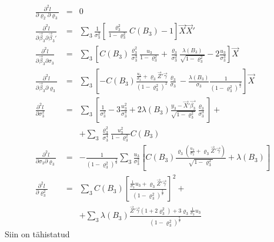 \documentclass[a4paper]{article}
\numberwithin{equation}{subsection}
\begin{document}
\begin{eqnarray}
\frac{ \partial^2 l}{\partial\varrho_2 \partial\varrho_3}
  &=& 0 \\
\frac{ \partial^2 l}{\partial\vec{\beta}_3 \partial\vec{\beta}_3'} &=&
  \sum_3 \frac{1}{\sigma_3^2} \left[
  \frac{\varrho_3^2}{1 - \varrho_3^2}C(B_3) - 1 \right]
  \vec{X}\vec{X}' \\
\frac{ \partial^2 l}{\partial\vec{\beta}_3 \partial\sigma_3} &=&
  \sum_3 \left[
    C(B_3) \frac{\varrho_3^2}{\sigma_3^3}
      \frac{u_3}{1 - \varrho_3^2}
    + \frac{\varrho_3}{\sigma_3^2}
      \frac{\lambda(B_3)}{\sqrt{1 - \varrho_3^2}}
    - 2\frac{u_3}{\sigma_3^3}
    \right] \vec{X} \\
\frac{ \partial^2 l}{\partial\vec{\beta}_3 \partial\varrho_3} &=&
  \sum_3 \left[
    -C(B_3) \frac
      {\displaystyle \frac{u_3}{\sigma_3} +
        \varrho_3\vec{Z}'\vec{\gamma}}
      {(1 - \varrho_3^2)^2}
      \frac{\varrho_3}{\sigma_3}
    - \frac{\lambda(B_3)}{\sigma_3}
      \frac{1}{(1 - \varrho_3^2)^\frac{3}{2}}
    \right] \vec{X}\\
\frac{ \partial^2 l}{\partial \sigma_3^2} &=&
  \sum_3 \left[
    \frac{1}{\sigma_3^2}
    - 3 \frac{ u_3^2}{\sigma_3^4}
    + 2 \lambda( B_3)
      \frac{y_3 - \vec{X}'\vec{\beta_3}}{\sqrt{1- \varrho_3^2}}
      \frac{\varrho_3}{\sigma_3^3}
    \right] + \nonumber\\
&&  + \sum_3
      \frac{\varrho_3^2}{\sigma_3^4}
      \frac{ u_3^2}{1 - \varrho_3^2}
      C(B_3) \\
\frac{ \partial^2 l}{\partial \sigma_3 \partial\varrho_3} &=&
  -\frac{1}{(1 - \varrho_3^2)^\frac{3}{2}}
  \sum_3  \frac{u_3}{\sigma_3^2} \left[
    C(B_3) \frac
      {\varrho_3 \left(
      \displaystyle \frac{u_3}{\sigma_3} +
        \varrho_3 \vec{Z}'\vec{\gamma} \right)}
      {\sqrt{1-\varrho_3^2}}
    + \lambda( B_3)
    \right]\\
\frac{ \partial^2 l}{\partial \varrho_3^2} &=&
  \sum_3
    C(B_3) \left[ \frac
      {\displaystyle \frac{1}{\sigma_3}u_3
        + \varrho_3 \vec{Z}'\vec{\gamma}}
      {( 1 - \varrho_3^2)^\frac{3}{2}}
      \right]^2 + \nonumber\\
&&  + \sum_3 \lambda( B_3)
      \frac
        {\vec{Z}'\vec{\gamma}( 1 + 2 \varrho_3^2) +
          3 \varrho_3 \displaystyle \frac{1}{\sigma_3} u_3}
        {(1-\varrho_3^2)^\frac{7}{2}}
%
\end{eqnarray}
Siin on tähistatud
\end{document}
